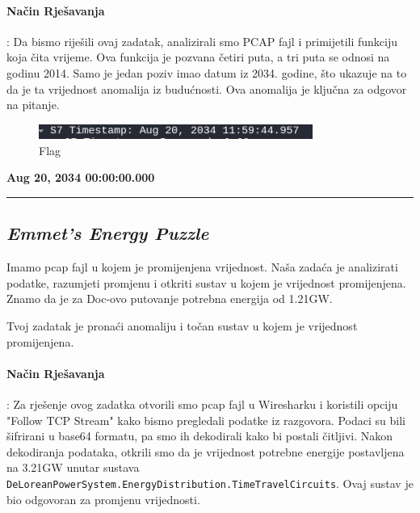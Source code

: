 \documentclass{article}
\begin{document}
\paragraph{Način Rješavanja}:
Da bismo riješili ovaj zadatak, analizirali smo PCAP fajl i primijetili funkciju koja čita vrijeme. Ova funkcija je pozvana četiri puta, a tri puta se odnosi na godinu 2014. Samo je jedan poziv imao datum iz 2034. godine, što ukazuje na to da je ta vrijednost anomalija iz budućnosti. Ova anomalija je ključna za odgovor na pitanje.

\begin{figure}[h]
    \centering
    \includegraphics[width=0.8\textwidth]{TemporalNetAnom.png}
    \caption{Flag}
    \label{fig:flag_wireshark_temporal}
\end{figure}

\begin{center}
    \textbf{Aug 20, 2034 00:00:00.000}
\end{center}

\noindent\rule{\textwidth}{0.4pt}

\subsection{\textit{Emmet's Energy Puzzle}}
\begin{tcolorbox}[
    colback=gray!5,  %
    colframe=gray!75,  %
    title=\textbf{Zadatak}]
    Imamo pcap fajl u kojem je promijenjena vrijednost. Naša zadaća je analizirati podatke, razumjeti promjenu i otkriti sustav u kojem je vrijednost promijenjena. Znamo da je za Doc-ovo putovanje potrebna energija od 1.21GW.

    Tvoj zadatak je pronaći anomaliju i točan sustav u kojem je vrijednost promijenjena.
\end{tcolorbox}

\paragraph{Način Rješavanja}: 
Za rješenje ovog zadatka otvorili smo pcap fajl u Wiresharku i koristili opciju "Follow TCP Stream" kako bismo pregledali podatke iz razgovora. Podaci su bili šifrirani u base64 formatu, pa smo ih dekodirali kako bi postali čitljivi. Nakon dekodiranja podataka, otkrili smo da je vrijednost potrebne energije postavljena na 3.21GW unutar sustava \texttt{DeLoreanPowerSystem.EnergyDistribution.TimeTravelCircuits}. Ovaj sustav je bio odgovoran za promjenu vrijednosti.
\end{document}
